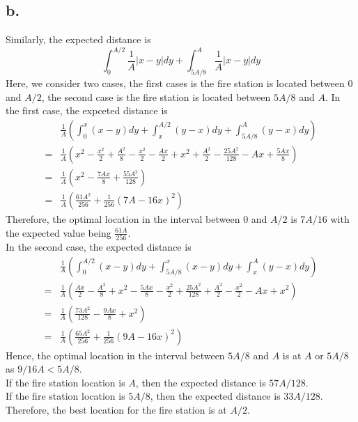 \documentclass[11pt]{article}
\begin{document}
\subsection*{b.}
Similarly, the expected distance is 
\[ 
    \int_0^{A/2} \frac{1}{A} |x-y| dy + \int_{5A/8}^A \frac{1}{A} |x-y| dy 
\]
Here, we consider two cases, the first cases is the fire station is located between $0$ and $A/2$, 
the second case is the fire station is located between $5A/8$ and $A$. 
In the first case, the expceted distance is 
\begin{equation*}
    \begin{aligned}
        &\frac{1}{A} \left( \int_0^x (x-y) dy + \int_x^{A/2} (y-x) dy + \int_{5A/8}^A (y-x) dy \right) \\
        =&\frac{1}{A} \left( x^2-\frac{x^2}{2} + \frac{A^2}{8} - \frac{x^2}{2} - \frac{Ax}{2} + x^2 + \frac{A^2}{2} - \frac{25A^2}{128} -Ax +\frac{5Ax}{8}\right) \\
        =& \frac{1}{A} \left( x^2 - \frac{7Ax}{8} + \frac{55A^2}{128} \right) \\   
        =& \frac{1}{A} \left(\frac{61A^2}{256} + \frac{1}{256}(7 A - 16 x)^2 \right)
    \end{aligned}
\end{equation*}
Therefore, the optimal location in the interval between $0$ and $A/2$ is $7A/16$ with the expected value being $\frac{61A}{256}$. \\
In the second case, the expected distance is
\begin{equation*}
    \begin{aligned}
        &\frac{1}{A} \left( \int_0^{A/2} (x-y) dy + \int_{5A/8}^{x} (x-y) dy + \int_x^A (y-x) dy \right) \\
        =&\frac{1}{A} \left(\frac{Ax}{2} - \frac{A^2}{8} + x^2 - \frac{5Ax}{8} -\frac{x^2}{2} + \frac{25A^2}{128} + \frac{A^2}{2} - \frac{x^2}{2} -Ax + x^2 \right) \\  
        =& \frac{1}{A}\left( \frac{73 A^2}{128} - \frac{9A x}{8} + x^2 \right) \\
        =& \frac{1}{A} \left(\frac{65A^2}{256}+ \frac{1}{256}(9A - 16x)^2 \right)
    \end{aligned}
\end{equation*}
Hence, the optimal location in the interval between $5A/8$ and $A$ is at $A$ or $5A/8$ as $9/16A < 5A/8$. \\
If the fire station location is $A$, then the expected distance is $57A/128$. \\
If the fire station location is $5A/8$, then the expected distance is $33A/128$. \\
Therefore, the best location for the fire station is at $A/2$.
\end{document}
